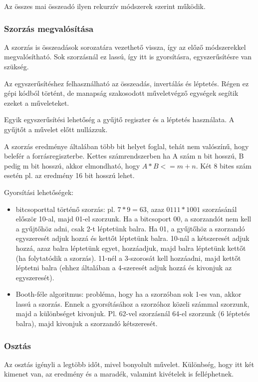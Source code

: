 Az összes mai összeadó ilyen rekurzív módszerek szerint működik.

\subsubsection{Szorzás megvalósítása}
A szorzás is összeadások sorozatára vezethető vissza, így az előző módszerekkel megvalósítható.
Sok szorzásnál ez lassú, így itt is gyorsításra, egyszerűsítésre van szükség.

Az egyszerűsítéshez felhasználható az összeadás, invertálás és léptetés.
Régen ez gépi kódból történt, de manapság szakosodott műveletvégző egységek segítik ezeket a műveleteket.

Egyik egyszerűsítési lehetőség a gyűjtő regiszter és a léptetés használata.
A gyűjtőt a művelet előtt nullázzuk.

A szorzás eredménye általában több bit helyet foglal, tehát nem valószínű, hogy belefér a forrásregiszterbe.
Kettes számrendszerben ha A szám n bit hosszú, B pedig m bit hosszú, akkor elmondható, hogy $A*B <= m+n$.
Két 8 bites szám esetén pl. az eredmény 16 bit hosszú lehet.

Gyorsítási lehetőségek:
\begin{itemize}
    \item bitcsoporttal történő szorzás: pl. $7*9=63$, azaz $0111*1001$ szorzásánál először 10-al, majd 01-el szorzunk. Ha a bitcsoport 00, a szorzandót nem kell a gyűjtőhöz adni, csak 2-t léptetünk balra. Ha 01, a gyűjtőhöz a szorzandó egyszeresét adjuk hozzá és kettőt léptetünk balra. 10-nál a kétszeresét adjuk hozzá, azaz balra léptetünk egyet, hozzáadjuk, majd balra léptetünk kettőt (ha folytatódik a szorzás). 11-nél a 3-szorosát kell hozzáadni, majd kettőt léptetni balra (ehhez általában a 4-szeresét adjuk hozzá és kivonjuk az egyszeresét).
    \item Booth-féle algoritmus: probléma, hogy ha a szorzóban sok 1-es van, akkor lassú a szorzás. Ennek a gyorsításához a szorzóhoz közeli számmal szorzunk, majd a különbséget kivonjuk. Pl. 62-vel szorzásnál 64-el szorzunk (6 léptetés balra), majd kivonjuk a szorzandó kétszeresét.
\end{itemize}

\subsubsection{Osztás}
Az osztás igényli a legtöbb időt, mivel bonyolult művelet.
Különbség, hogy itt két kimenet van, az eredmény és a maradék, valamint kivételek is felléphetnek.



